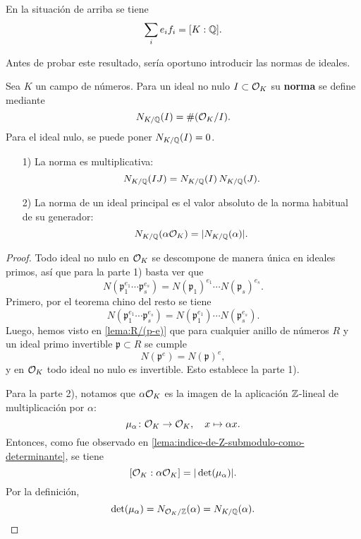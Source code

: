 \begin{teorema}
  \label{teorema:ei-fi}
  En la situación de arriba se tiene
  $$\sum_i e_i f_i = [K : \mathbb{Q}].$$
\end{teorema}

Antes de probar este resultado, sería oportuno introducir las normas de ideales.

\begin{definicion}
  Sea $K$ un campo de números. Para un ideal no nulo $I \subset \mathcal{O}_K$
  su \textbf{norma} se define mediante
  $$N_{K/\mathbb{Q}} (I) = \# (\mathcal{O}_K / I).$$
  Para el ideal nulo, se puede poner $N_{K/\mathbb{Q}} (I) = 0$.
\end{definicion}

\begin{lema}
  \begin{enumerate}
  \item[1)] La norma es multiplicativa:
  $$N_{K/\mathbb{Q}} (IJ) = N_{K/\mathbb{Q}} (I)\,N_{K/\mathbb{Q}} (J).$$

  \item[2)] La norma de un ideal principal es el valor absoluto de la norma
  habitual de su generador:
  $$N_{K/\mathbb{Q}} (\alpha \mathcal{O}_K) = |N_{K/\mathbb{Q}} (\alpha)|.$$
  \end{enumerate}

  \begin{proof}
    Todo ideal no nulo en $\mathcal{O}_K$ se descompone de manera única en ideales
    primos, así que para la parte 1) basta ver que
    \[ N (\mathfrak{p}_1^{e_1}\cdots\mathfrak{p}_s^{e_s}) =
       N (\mathfrak{p}_1)^{e_1}\cdots N (\mathfrak{p}_s)^{e_s}. \]
    Primero, por el teorema chino del resto se tiene
    \[ N (\mathfrak{p}_1^{e_1}\cdots\mathfrak{p}_s^{e_s}) =
       N (\mathfrak{p}_1^{e_1})\cdots N (\mathfrak{p}_s^{e_s}). \]
    Luego, hemos visto en \ref{lema:R/(p-e)} que para cualquier anillo de
    números $R$ y un ideal primo invertible $\mathfrak{p} \subset R$ se cumple
    $$N (\mathfrak{p}^e) = N (\mathfrak{p})^e,$$
    y en $\mathcal{O}_K$ todo ideal no nulo es invertible. Esto establece la parte 1).

    Para la parte 2), notamos que $\alpha \mathcal{O}_K$ es la imagen de la aplicación
    $\mathbb{Z}$-lineal de multiplicación por $\alpha$:
    $$\mu_\alpha\colon \mathcal{O}_K \to \mathcal{O}_K, \quad x \mapsto \alpha x.$$
    Entonces, como fue observado en
    \ref{lema:indice-de-Z-submodulo-como-determinante}, se tiene
    $$[\mathcal{O}_K : \alpha\mathcal{O}_K] = |\det (\mu_\alpha)|.$$
    Por la definición,
    \[ \det (\mu_\alpha)
       = N_{\mathcal{O}_K/\mathbb{Z}} (\alpha) = N_{K/\mathbb{Q}} (\alpha). \qedhere \]
  \end{proof}
\end{lema}

